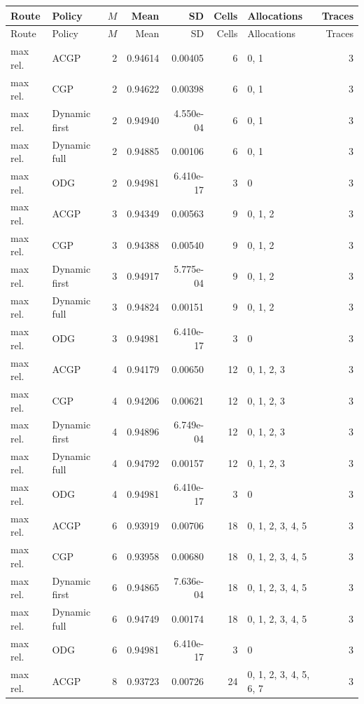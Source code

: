 \documentclass[10pt,a4paper]{article}
\begin{document}
\tiny\setlength{\tabcolsep}{2pt}\begin{longtable}{@{}p{23mm}p{29mm}rrrrp{36mm}r@{}}
\toprule Route & Policy & $M$ & Mean & SD & Cells & Allocations & Traces \\ \midrule\endfirsthead
\toprule Route & Policy & $M$ & Mean & SD & Cells & Allocations & Traces \\ \midrule\endhead
\bottomrule\endfoot
max rel. & ACGP & 2 & 0.94614 & 0.00405 & 6 & 0, 1 & 3 \\
max rel. & CGP & 2 & 0.94622 & 0.00398 & 6 & 0, 1 & 3 \\
max rel. & Dynamic first & 2 & 0.94940 & 4.550e-04 & 6 & 0, 1 & 3 \\
max rel. & Dynamic full & 2 & 0.94885 & 0.00106 & 6 & 0, 1 & 3 \\
max rel. & ODG & 2 & 0.94981 & 6.410e-17 & 3 & 0 & 3 \\
max rel. & ACGP & 3 & 0.94349 & 0.00563 & 9 & 0, 1, 2 & 3 \\
max rel. & CGP & 3 & 0.94388 & 0.00540 & 9 & 0, 1, 2 & 3 \\
max rel. & Dynamic first & 3 & 0.94917 & 5.775e-04 & 9 & 0, 1, 2 & 3 \\
max rel. & Dynamic full & 3 & 0.94824 & 0.00151 & 9 & 0, 1, 2 & 3 \\
max rel. & ODG & 3 & 0.94981 & 6.410e-17 & 3 & 0 & 3 \\
max rel. & ACGP & 4 & 0.94179 & 0.00650 & 12 & 0, 1, 2, 3 & 3 \\
max rel. & CGP & 4 & 0.94206 & 0.00621 & 12 & 0, 1, 2, 3 & 3 \\
max rel. & Dynamic first & 4 & 0.94896 & 6.749e-04 & 12 & 0, 1, 2, 3 & 3 \\
max rel. & Dynamic full & 4 & 0.94792 & 0.00157 & 12 & 0, 1, 2, 3 & 3 \\
max rel. & ODG & 4 & 0.94981 & 6.410e-17 & 3 & 0 & 3 \\
max rel. & ACGP & 6 & 0.93919 & 0.00706 & 18 & 0, 1, 2, 3, 4, 5 & 3 \\
max rel. & CGP & 6 & 0.93958 & 0.00680 & 18 & 0, 1, 2, 3, 4, 5 & 3 \\
max rel. & Dynamic first & 6 & 0.94865 & 7.636e-04 & 18 & 0, 1, 2, 3, 4, 5 & 3 \\
max rel. & Dynamic full & 6 & 0.94749 & 0.00174 & 18 & 0, 1, 2, 3, 4, 5 & 3 \\
max rel. & ODG & 6 & 0.94981 & 6.410e-17 & 3 & 0 & 3 \\
max rel. & ACGP & 8 & 0.93723 & 0.00726 & 24 & 0, 1, 2, 3, 4, 5, 6, 7 & 3 \\

\end{longtable}
\end{document}
